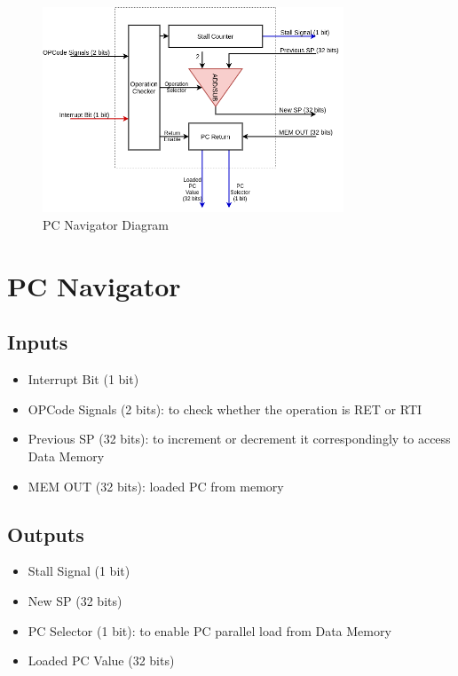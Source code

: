 \begin{center}
    \begin{figure}[hp]
        \centering
        \includegraphics[width=0.8\textwidth]{images/pc_nav.png}
        \caption{PC Navigator Diagram}
        \label{fig:reg_file}
    \end{figure}
\end{center}

\section{PC Navigator}

\subsection{Inputs}
\begin{itemize}
    \item Interrupt Bit (1 bit)
    \item OPCode Signals (2 bits): to check whether the operation is RET or RTI
    \item Previous SP (32 bits): to increment or decrement it correspondingly to access Data Memory
    \item MEM OUT (32 bits): loaded PC from memory
\end{itemize}

\subsection{Outputs}
\begin{itemize}
    \item Stall Signal (1 bit)
    \item New SP (32 bits)
    \item PC Selector (1 bit): to enable PC parallel load from Data Memory
    \item Loaded PC Value (32 bits)
\end{itemize}

